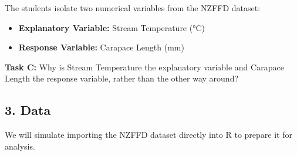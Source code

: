\documentclass[
  11pt,
  a4paper,
  oneside,
  open=any]{scrbook}
\providecommand{\tightlist}{%
  \setlength{\itemsep}{0pt}\setlength{\parskip}{0pt}}
\begin{document}
The students isolate two numerical variables from the NZFFD dataset:

\begin{itemize}
\tightlist
\item
  \textbf{Explanatory Variable:} Stream Temperature (°C)
\item
  \textbf{Response Variable:} Carapace Length (mm)
\end{itemize}

\textbf{Task C:} Why is Stream Temperature the explanatory variable and
Carapace Length the response variable, rather than the other way around?

\subsection{3. Data}\label{data}

We will simulate importing the NZFFD dataset directly into R to prepare
it for analysis.
\end{document}
